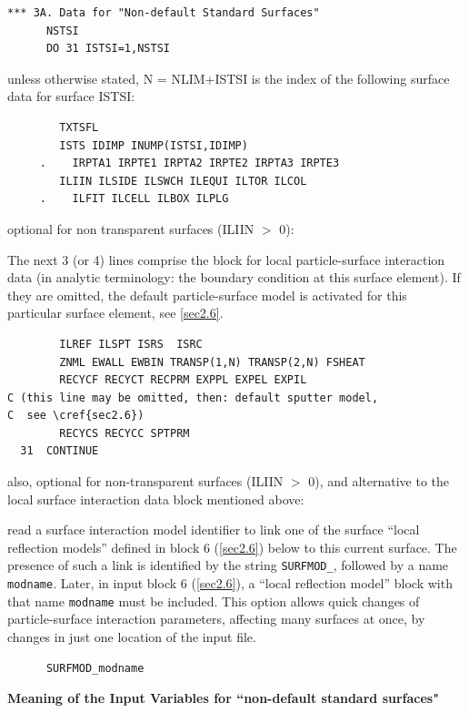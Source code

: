 \begin{lstlisting}
*** 3A. Data for "Non-default Standard Surfaces"
      NSTSI
      DO 31 ISTSI=1,NSTSI
\end{lstlisting}

unless otherwise stated, N = NLIM+ISTSI is the index of the following
surface data for surface ISTSI:

\begin{lstlisting}
        TXTSFL
        ISTS IDIMP INUMP(ISTSI,IDIMP)
     .    IRPTA1 IRPTE1 IRPTA2 IRPTE2 IRPTA3 IRPTE3
        ILIIN ILSIDE ILSWCH ILEQUI ILTOR ILCOL
     .    ILFIT ILCELL ILBOX ILPLG
\end{lstlisting}

optional for non transparent surfaces (ILIIN $>$ 0):

The next 3 (or 4) lines comprise the block for local particle-surface
interaction data (in analytic terminology: the boundary condition at this
surface element).
If they are omitted, the default particle-surface model is activated for this
particular surface element, see \cref{sec2.6}.

\begin{lstlisting}
        ILREF ILSPT ISRS  ISRC
        ZNML EWALL EWBIN TRANSP(1,N) TRANSP(2,N) FSHEAT
        RECYCF RECYCT RECPRM EXPPL EXPEL EXPIL
C (this line may be omitted, then: default sputter model, 
C  see \cref{sec2.6})
        RECYCS RECYCC SPTPRM
  31  CONTINUE
\end{lstlisting}

also, optional for non-transparent surfaces (ILIIN $>$ 0), and
alternative to the local surface interaction data block mentioned
above:

read a surface interaction model identifier to link one of the surface
``local reflection
models'' defined in block 6 (\cref{sec2.6}) below to this current surface.
The presence of such a link is identified by the string \lstinline|SURFMOD_|,
followed by a name \lstinline|modname|.
Later, in input block 6 (\cref{sec2.6}), a ``local reflection model'' block
with that name \lstinline|modname| must be included.
This option allows quick changes of particle-surface interaction parameters,
affecting many surfaces at once, by changes in just one location of the input
file.

\begin{lstlisting}
      SURFMOD_modname
\end{lstlisting}

\medskip

\textbf{Meaning of the Input Variables for ``non-default standard surfaces"}

